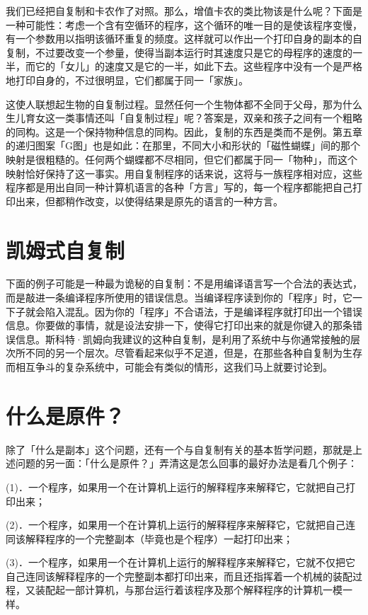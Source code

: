 \documentclass[
  12pt,
  twoside,
  openright,
  oldfontcommands,
]{memoir}
\begin{document}
我们已经把自复制和卡农作了对照。那么，增值卡农的类比物该是什么呢？下面是一种可能性：考虑一个含有空循环的程序，这个循环的唯一目的是使该程序变慢，有一个参数用以指明该循环重复的频度。这样就可以作出一个打印自身的副本的自复制，不过要改变一个参量，使得当副本运行时其速度只是它的母程序的速度的一半，而它的「女儿」的速度又是它的一半，如此下去。这些程序中没有一个是严格地打印自身的，不过很明显，它们都属于同一「家族」。

这使人联想起生物的自复制过程。显然任何一个生物体都不全同于父母，那为什么生儿育女这一类事情还叫「自复制过程」呢？答案是，双亲和孩子之间有一个粗略的同构。这是一个保持物种信息的同构。因此，复制的东西是类而不是例。第五章的递归图案「G图」也是如此：在那里，不同大小和形状的「磁性蝴蝶」间的那个映射是很粗糙的。任何两个蝴蝶都不尽相同，但它们都属于同一「物种」，而这个映射恰好保持了这一事实。用自复制程序的话来说，这将与一族程序相对应，这些程序都是用出自同一种计算机语言的各种「方言」写的，每一个程序都能把自己打印出来，但都稍作改变，以使得结果是原先的语言的一种方言。

\section{凯姆式自复制}

下面的例子可能是一种最为诡秘的自复制：不是用编译语言写一个合法的表达式，而是敲进一条编译程序所使用的错误信息。当编译程序读到你的「程序」时，它一下子就会陷入混乱。因为你的「程序」不合语法，于是编译程序就打印出一个错误信息。你要做的事情，就是设法安排一下，使得它打印出来的就是你键入的那条错误信息。斯科特·凯姆向我建议的这种自复制，是利用了系统中与你通常接触的层次所不同的另一个层次。尽管看起来似乎不足道，但是，在那些各种自复制为生存而相互争斗的复杂系统中，可能会有类似的情形，这我们马上就要讨论到。

\section{什么是原件？}

除了「什么是副本」这个问题，还有一个与自复制有关的基本哲学问题，那就是上述问题的另一面：「什么是原件？」弄清这是怎么回事的最好办法是看几个例子：

(1)．一个程序，如果用一个在计算机上运行的解释程序来解释它，它就把自己打印出来；

(2)．一个程序，如果用一个在计算机上运行的解释程序来解释它，它就把自己连同该解释程序的一个完整副本（毕竟也是个程序）一起打印出来；

(3)．一个程序，如果用一个在计算机上运行的解释程序来解释它，它就不仅把它自己连同该解释程序的一个完整副本都打印出来，而且还指挥着一个机械的装配过程，又装配起一部计算机，与那台运行着该程序及那个解释程序的计算机一模一样。
\end{document}
